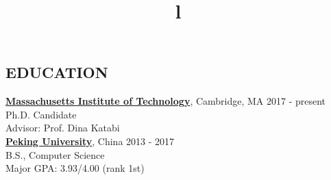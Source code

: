 \documentclass[margin]{res}
\newcommand{\Bullet}[1]{{\raisebox{0.25ex}{\tiny$\bullet$\ }}{#1}\\}
\begin{document}


\address{ \href{mailto:haohe@mit.edu}{haohe@mit.edu} $\mid$ {+1\ 640-840-0491} }


\begin{resume}

\section{EDUCATION}
\href{http://web.mit.edu}{\textbf{Massachusetts Institute of Technology}}, Cambridge, MA
\hfill 2017 - present
\\
Ph.D. Candidate
\\
\Bullet{Advisor: Prof. Dina Katabi}
\href{http://english.pku.edu.cn/}{\textbf{Peking University}}, China
\hfill 2013 - 2017
\\
B.S., Computer Science
\\
\Bullet{Major GPA: 3.93/4.00 (rank 1st)}
\vspace{-15mm}

\begin{format}
\title{l} \hfill {}\\
\body\\
\end{format}


\end{resume}
\end{document}

